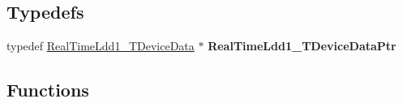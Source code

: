 \subsection*{Typedefs}
\begin{DoxyCompactItemize}
\item 
\hypertarget{group___real_time_ldd1__module_gadd1a4149b1842924d797cdbc4cc2b24f}{typedef \hyperlink{struct_real_time_ldd1___t_device_data}{Real\-Time\-Ldd1\-\_\-\-T\-Device\-Data} $\ast$ {\bfseries Real\-Time\-Ldd1\-\_\-\-T\-Device\-Data\-Ptr}}\label{group___real_time_ldd1__module_gadd1a4149b1842924d797cdbc4cc2b24f}

\end{DoxyCompactItemize}
\subsection*{Functions}
